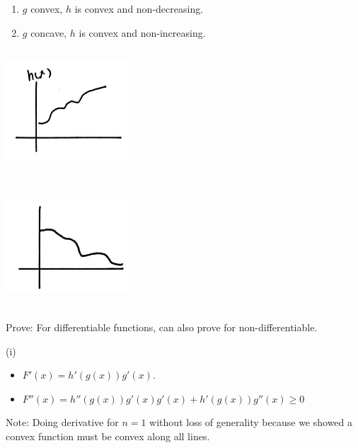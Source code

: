\begin{enumerate}
	\item $g$ convex, $h$ is convex and non-decreasing.
	
	\item $g$ concave, $h$ is convex and non-increasing.
\end{enumerate}

\begin{marginfigure}
	\centering
	\includegraphics[width=1.8in,height=1.8in]{figures/ch08/figure1111_4.png}
\end{marginfigure}

\begin{marginfigure}
	\centering
	\includegraphics[width=1.8in,height=1.8in]{figures/ch08/figure1111_5.png}
\end{marginfigure}

Prove: For differentiable functions, can also prove for non-differentiable. 

(i)

\begin{itemize}
	\item $F'(x) = h'(g(x))g'(x)$.
	
	\item $F''(x) = h''(g(x))g'(x)g'(x) + h'(g(x))g''(x) \geq 0$ 
\end{itemize}



Note: Doing derivative for $n=1$ without loss of generality because we showed a convex function must be convex along all lines. 



